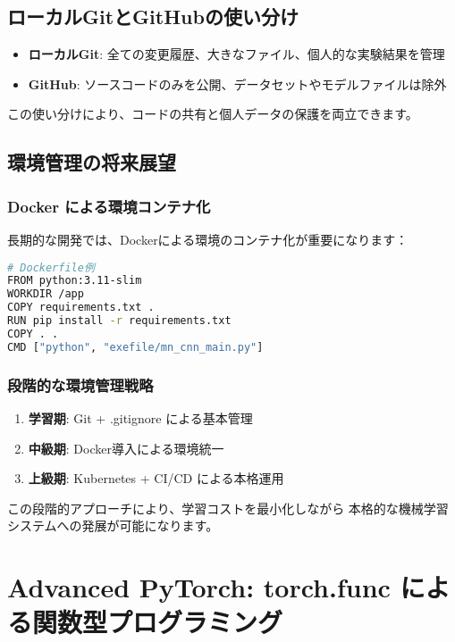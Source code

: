 \documentclass{ltjsarticle}      %
\begin{document}
\subsection{ローカルGitとGitHubの使い分け}
\begin{itemize}
    \item \textbf{ローカルGit}: 全ての変更履歴、大きなファイル、個人的な実験結果を管理
    \item \textbf{GitHub}: ソースコードのみを公開、データセットやモデルファイルは除外
\end{itemize}

この使い分けにより、コードの共有と個人データの保護を両立できます。

\subsection{環境管理の将来展望}

\subsubsection{Docker による環境コンテナ化}
長期的な開発では、Dockerによる環境のコンテナ化が重要になります：

\begin{lstlisting}[language=bash]
# Dockerfile例
FROM python:3.11-slim
WORKDIR /app
COPY requirements.txt .
RUN pip install -r requirements.txt
COPY . .
CMD ["python", "exefile/mn_cnn_main.py"]
\end{lstlisting}

\subsubsection{段階的な環境管理戦略}
\begin{enumerate}
    \item \textbf{学習期}: Git + .gitignore による基本管理
    \item \textbf{中級期}: Docker導入による環境統一
    \item \textbf{上級期}: Kubernetes + CI/CD による本格運用
\end{enumerate}

この段階的アプローチにより、学習コストを最小化しながら
本格的な機械学習システムへの発展が可能になります。

\section{Advanced PyTorch: torch.func による関数型プログラミング}
\end{document}
